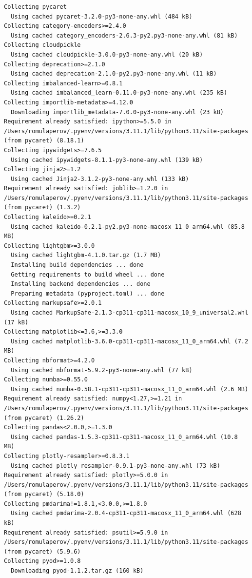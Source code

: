 \documentclass[
  letterpaper,
  DIV=11,
  numbers=noendperiod]{scrartcl}
\begin{document}
\begin{verbatim}
Collecting pycaret
  Using cached pycaret-3.2.0-py3-none-any.whl (484 kB)
Collecting category-encoders>=2.4.0
  Using cached category_encoders-2.6.3-py2.py3-none-any.whl (81 kB)
Collecting cloudpickle
  Using cached cloudpickle-3.0.0-py3-none-any.whl (20 kB)
Collecting deprecation>=2.1.0
  Using cached deprecation-2.1.0-py2.py3-none-any.whl (11 kB)
Collecting imbalanced-learn>=0.8.1
  Using cached imbalanced_learn-0.11.0-py3-none-any.whl (235 kB)
Collecting importlib-metadata>=4.12.0
  Downloading importlib_metadata-7.0.0-py3-none-any.whl (23 kB)
Requirement already satisfied: ipython>=5.5.0 in /Users/romulaperov/.pyenv/versions/3.11.1/lib/python3.11/site-packages (from pycaret) (8.18.1)
Collecting ipywidgets>=7.6.5
  Using cached ipywidgets-8.1.1-py3-none-any.whl (139 kB)
Collecting jinja2>=1.2
  Using cached Jinja2-3.1.2-py3-none-any.whl (133 kB)
Requirement already satisfied: joblib>=1.2.0 in /Users/romulaperov/.pyenv/versions/3.11.1/lib/python3.11/site-packages (from pycaret) (1.3.2)
Collecting kaleido>=0.2.1
  Using cached kaleido-0.2.1-py2.py3-none-macosx_11_0_arm64.whl (85.8 MB)
Collecting lightgbm>=3.0.0
  Using cached lightgbm-4.1.0.tar.gz (1.7 MB)
  Installing build dependencies ... done
  Getting requirements to build wheel ... done
  Installing backend dependencies ... done
  Preparing metadata (pyproject.toml) ... done
Collecting markupsafe>=2.0.1
  Using cached MarkupSafe-2.1.3-cp311-cp311-macosx_10_9_universal2.whl (17 kB)
Collecting matplotlib<=3.6,>=3.3.0
  Using cached matplotlib-3.6.0-cp311-cp311-macosx_11_0_arm64.whl (7.2 MB)
Collecting nbformat>=4.2.0
  Using cached nbformat-5.9.2-py3-none-any.whl (77 kB)
Collecting numba>=0.55.0
  Using cached numba-0.58.1-cp311-cp311-macosx_11_0_arm64.whl (2.6 MB)
Requirement already satisfied: numpy<1.27,>=1.21 in /Users/romulaperov/.pyenv/versions/3.11.1/lib/python3.11/site-packages (from pycaret) (1.26.2)
Collecting pandas<2.0.0,>=1.3.0
  Using cached pandas-1.5.3-cp311-cp311-macosx_11_0_arm64.whl (10.8 MB)
Collecting plotly-resampler>=0.8.3.1
  Using cached plotly_resampler-0.9.1-py3-none-any.whl (73 kB)
Requirement already satisfied: plotly>=5.0.0 in /Users/romulaperov/.pyenv/versions/3.11.1/lib/python3.11/site-packages (from pycaret) (5.18.0)
Collecting pmdarima!=1.8.1,<3.0.0,>=1.8.0
  Using cached pmdarima-2.0.4-cp311-cp311-macosx_11_0_arm64.whl (628 kB)
Requirement already satisfied: psutil>=5.9.0 in /Users/romulaperov/.pyenv/versions/3.11.1/lib/python3.11/site-packages (from pycaret) (5.9.6)
Collecting pyod>=1.0.8
  Downloading pyod-1.1.2.tar.gz (160 kB)

\end{verbatim}
\end{document}

